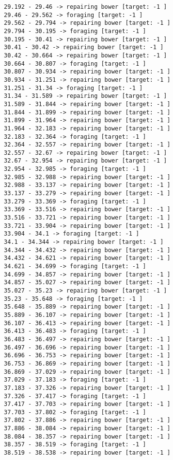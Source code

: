 \documentclass[11pt]{article}
\begin{document}
\begin{Verbatim}[commandchars=\\\{\}]
29.192 - 29.46 -> repairing bower [target: -1 ]
29.46 - 29.562 -> foraging [target: -1 ]
29.562 - 29.794 -> repairing bower [target: -1 ]
29.794 - 30.195 -> foraging [target: -1 ]
30.195 - 30.41 -> repairing bower [target: -1 ]
30.41 - 30.42 -> repairing bower [target: -1 ]
30.42 - 30.664 -> repairing bower [target: -1 ]
30.664 - 30.807 -> foraging [target: -1 ]
30.807 - 30.934 -> repairing bower [target: -1 ]
30.934 - 31.251 -> repairing bower [target: -1 ]
31.251 - 31.34 -> foraging [target: -1 ]
31.34 - 31.589 -> repairing bower [target: -1 ]
31.589 - 31.844 -> repairing bower [target: -1 ]
31.844 - 31.899 -> repairing bower [target: -1 ]
31.899 - 31.964 -> repairing bower [target: -1 ]
31.964 - 32.183 -> repairing bower [target: -1 ]
32.183 - 32.364 -> foraging [target: -1 ]
32.364 - 32.557 -> repairing bower [target: -1 ]
32.557 - 32.67 -> repairing bower [target: -1 ]
32.67 - 32.954 -> repairing bower [target: -1 ]
32.954 - 32.985 -> foraging [target: -1 ]
32.985 - 32.988 -> repairing bower [target: -1 ]
32.988 - 33.137 -> repairing bower [target: -1 ]
33.137 - 33.279 -> repairing bower [target: -1 ]
33.279 - 33.369 -> foraging [target: -1 ]
33.369 - 33.516 -> repairing bower [target: -1 ]
33.516 - 33.721 -> repairing bower [target: -1 ]
33.721 - 33.904 -> repairing bower [target: -1 ]
33.904 - 34.1 -> foraging [target: -1 ]
34.1 - 34.344 -> repairing bower [target: -1 ]
34.344 - 34.432 -> repairing bower [target: -1 ]
34.432 - 34.621 -> repairing bower [target: -1 ]
34.621 - 34.699 -> foraging [target: -1 ]
34.699 - 34.857 -> repairing bower [target: -1 ]
34.857 - 35.027 -> repairing bower [target: -1 ]
35.027 - 35.23 -> repairing bower [target: -1 ]
35.23 - 35.648 -> foraging [target: -1 ]
35.648 - 35.889 -> repairing bower [target: -1 ]
35.889 - 36.107 -> repairing bower [target: -1 ]
36.107 - 36.413 -> repairing bower [target: -1 ]
36.413 - 36.483 -> foraging [target: -1 ]
36.483 - 36.497 -> repairing bower [target: -1 ]
36.497 - 36.696 -> repairing bower [target: -1 ]
36.696 - 36.753 -> repairing bower [target: -1 ]
36.753 - 36.869 -> repairing bower [target: -1 ]
36.869 - 37.029 -> repairing bower [target: -1 ]
37.029 - 37.183 -> foraging [target: -1 ]
37.183 - 37.326 -> repairing bower [target: -1 ]
37.326 - 37.417 -> foraging [target: -1 ]
37.417 - 37.703 -> repairing bower [target: -1 ]
37.703 - 37.802 -> foraging [target: -1 ]
37.802 - 37.886 -> repairing bower [target: -1 ]
37.886 - 38.084 -> repairing bower [target: -1 ]
38.084 - 38.357 -> repairing bower [target: -1 ]
38.357 - 38.519 -> foraging [target: -1 ]
38.519 - 38.538 -> repairing bower [target: -1 ]

\end{Verbatim}
\end{document}
